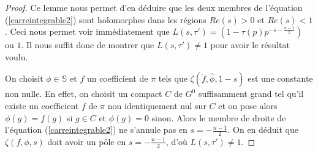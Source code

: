 \begin{proof}
Ce lemme nous permet d'en déduire que les deux membres de l'équation (\ref{carreintegrable2}) sont holomorphes dans les régions $Re(s) > 0$ et $Re(s) < 1$. Ceci nous permet voir immédiatement que $L(s, \tau') = (1-\tau(p)p^{-s-\frac{n-1}{2}})$ ou $1$. Il nous suffit donc de montrer que $L(s, \tau') \neq 1$ pour avoir le résultat voulu.

On choisit $\phi \in \mathbb{S}$ et $f$ un coefficient de $\pi$ tels que $\zeta(\check{f}, \hat{\phi}, 1-s)$ est une constante non nulle. En effet, on choisit un compact $C$ de $G^0$ suffisamment grand tel qu'il existe un coefficient $f$ de $\pi$ non identiquement nul sur $C$ et on pose alors $\phi(g) = \overline{f(g)}$ si $g \in C$ et $\phi(g)=0$ sinon. Alors le membre de droite de l'équation (\ref{carreintegrable2}) ne s'annule pas en $s=-\frac{n-1}{2}$. On en déduit que $\zeta(f, \phi, s)$ doit avoir un pôle en $s=-\frac{n-1}{2}$, d'où $L(s,\tau')\neq 1$.
\end{proof}